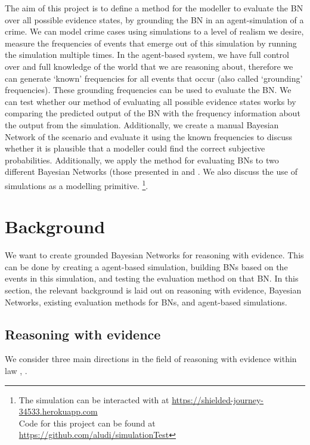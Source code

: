 \documentclass[12pt]{article}
\begin{document}
The aim of this project is to define a method for the modeller to evaluate the BN over all possible evidence states, by grounding the BN in an agent-simulation of a crime. We can model crime cases using simulations to a level of realism we desire, measure the frequencies of events that emerge out of this simulation by running the simulation multiple times. In the agent-based system, we have full control over and full knowledge of the world that we are reasoning about, therefore we can generate `known' frequencies for all events that occur (also called `grounding' frequencies). These grounding frequencies can be used to evaluate the BN. We can test whether our method of evaluating all possible evidence states works by comparing the predicted output of the BN with the frequency information about the output from the simulation. Additionally, we create a manual Bayesian Network of the scenario and evaluate it using the known frequencies to discuss whether it is plausible that a modeller could find the correct subjective probabilities. Additionally, we apply the method for evaluating BNs to two different Bayesian Networks (those presented in \citet{deZoete2019} and \citet{vanLeeuwen2019}.  We also discuss the use of simulations as a modelling primitive. 
 \footnote{The simulation can be interacted with at \url{https://shielded-journey-34533.herokuapp.com} \\ Code for this project can be found at \url{https://github.com/aludi/simulationTest}}. 
 

\newpage

\section{Background}

We want to create grounded Bayesian Networks for reasoning with evidence. This can be done by creating a agent-based simulation, building BNs based on the events in this simulation, and testing the evaluation method on that BN. In this section, the relevant background is laid out on reasoning with evidence, Bayesian Networks, existing evaluation methods for BNs, and agent-based simulations.


\subsection{Reasoning with evidence}
We consider three main directions in the field of reasoning with evidence within law \citep{Verheij2015}, \citep{diBelloVerheij2018}. 
\end{document}
